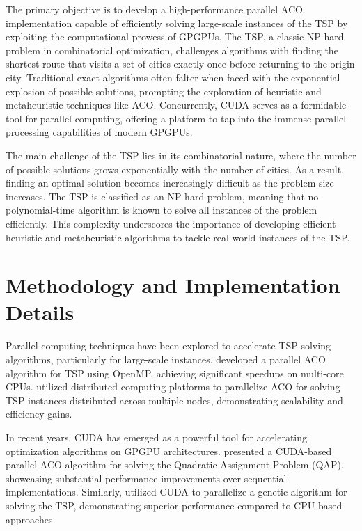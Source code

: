 \documentclass[11pt]{report}
\begin{document}
        The primary objective is to develop a high-performance parallel ACO implementation capable of efficiently solving large-scale instances of the TSP by exploiting the computational prowess of GPGPUs. The TSP, a classic NP-hard problem in combinatorial optimization, challenges algorithms with finding the shortest route that visits a set of cities exactly once before returning to the origin city. Traditional exact algorithms often falter when faced with the exponential explosion of possible solutions, prompting the exploration of heuristic and metaheuristic techniques like ACO. Concurrently, CUDA serves as a formidable tool for parallel computing, offering a platform to tap into the immense parallel processing capabilities of modern GPGPUs. 

        The main challenge of the TSP lies in its combinatorial nature, where the number of possible solutions grows exponentially with the number of cities. As a result, finding an optimal solution becomes increasingly difficult as the problem size increases. The TSP is classified as an NP-hard problem, meaning that no polynomial-time algorithm is known to solve all instances of the problem efficiently. This complexity underscores the importance of developing efficient heuristic and metaheuristic algorithms to tackle real-world instances of the TSP.
    
    \section{Methodology and Implementation Details}

        Parallel computing techniques have been explored to accelerate TSP solving algorithms, particularly for large-scale instances. \cite{LI2015994} developed a parallel ACO algorithm for TSP using OpenMP, achieving significant speedups on multi-core CPUs. \cite{STARZEC2020125} utilized distributed computing platforms to parallelize ACO for solving TSP instances distributed across multiple nodes, demonstrating scalability and efficiency gains.
    
        In recent years, CUDA has emerged as a powerful tool for accelerating optimization algorithms on GPGPU architectures. \cite{6337497} presented a CUDA-based parallel ACO algorithm for solving the Quadratic Assignment Problem (QAP), showcasing substantial performance improvements over sequential implementations. Similarly, \cite{chen2011cuda} utilized CUDA to parallelize a genetic algorithm for solving the TSP, demonstrating superior performance compared to CPU-based approaches.
\end{document}
